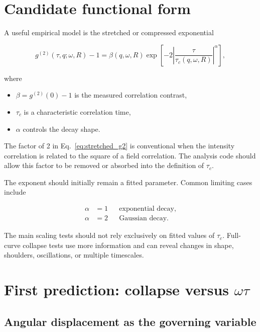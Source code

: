 \documentclass[11pt,letterpaper]{article}
\newcommand{\gtt}{g^{(2)}}
\begin{document}
\section{Candidate functional form}

A useful empirical model is the stretched or compressed exponential

\begin{equation}
    \gtt(\tau,q;\omega,R)-1
    =
    \beta(q,\omega,R)
    \exp\left[
    -2
    \left|
    \frac{\tau}{\tau_c(q,\omega,R)}
    \right|^\alpha
    \right],
    \label{eq:stretched_g2}
\end{equation}

where

\begin{itemize}[leftmargin=2em]
    \item $\beta=\gtt(0)-1$ is the measured correlation contrast,
    \item $\tau_c$ is a characteristic correlation time,
    \item $\alpha$ controls the decay shape.
\end{itemize}

The factor of 2 in Eq.~\eqref{eq:stretched_g2} is conventional when the
intensity correlation is related to the square of a field correlation.
The analysis code should allow this factor to be removed or absorbed into
the definition of $\tau_c$.

The exponent should initially remain a fitted parameter. Common limiting
cases include

\begin{align}
    \alpha &= 1
    &&\text{exponential decay},\\
    \alpha &= 2
    &&\text{Gaussian decay}.
\end{align}

The main scaling tests should not rely exclusively on fitted values of
$\tau_c$. Full-curve collapse tests use more information and can reveal
changes in shape, shoulders, oscillations, or multiple timescales.

\section{First prediction: collapse versus \texorpdfstring{$\omega\tau$}{omega tau}}

\subsection{Angular displacement as the governing variable}
\end{document}
